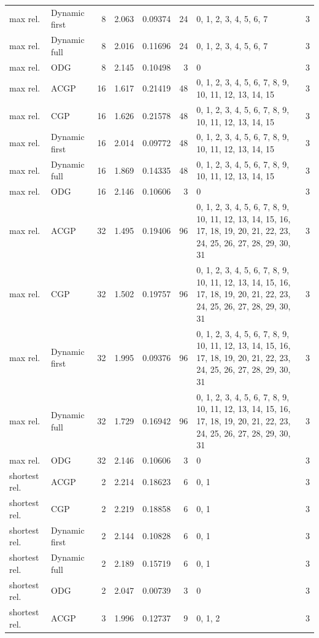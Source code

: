 \documentclass[10pt,a4paper]{article}
\begin{document}
\begin{longtable}{@{}p{23mm}p{29mm}rrrrp{36mm}r@{}}
max rel. & Dynamic first & 8 & 2.063 & 0.09374 & 24 & 0, 1, 2, 3, 4, 5, 6, 7 & 3 \\
max rel. & Dynamic full & 8 & 2.016 & 0.11696 & 24 & 0, 1, 2, 3, 4, 5, 6, 7 & 3 \\
max rel. & ODG & 8 & 2.145 & 0.10498 & 3 & 0 & 3 \\
max rel. & ACGP & 16 & 1.617 & 0.21419 & 48 & 0, 1, 2, 3, 4, 5, 6, 7, 8, 9, 10, 11, 12, 13, 14, 15 & 3 \\
max rel. & CGP & 16 & 1.626 & 0.21578 & 48 & 0, 1, 2, 3, 4, 5, 6, 7, 8, 9, 10, 11, 12, 13, 14, 15 & 3 \\
max rel. & Dynamic first & 16 & 2.014 & 0.09772 & 48 & 0, 1, 2, 3, 4, 5, 6, 7, 8, 9, 10, 11, 12, 13, 14, 15 & 3 \\
max rel. & Dynamic full & 16 & 1.869 & 0.14335 & 48 & 0, 1, 2, 3, 4, 5, 6, 7, 8, 9, 10, 11, 12, 13, 14, 15 & 3 \\
max rel. & ODG & 16 & 2.146 & 0.10606 & 3 & 0 & 3 \\
max rel. & ACGP & 32 & 1.495 & 0.19406 & 96 & 0, 1, 2, 3, 4, 5, 6, 7, 8, 9, 10, 11, 12, 13, 14, 15, 16, 17, 18, 19, 20, 21, 22, 23, 24, 25, 26, 27, 28, 29, 30, 31 & 3 \\
max rel. & CGP & 32 & 1.502 & 0.19757 & 96 & 0, 1, 2, 3, 4, 5, 6, 7, 8, 9, 10, 11, 12, 13, 14, 15, 16, 17, 18, 19, 20, 21, 22, 23, 24, 25, 26, 27, 28, 29, 30, 31 & 3 \\
max rel. & Dynamic first & 32 & 1.995 & 0.09376 & 96 & 0, 1, 2, 3, 4, 5, 6, 7, 8, 9, 10, 11, 12, 13, 14, 15, 16, 17, 18, 19, 20, 21, 22, 23, 24, 25, 26, 27, 28, 29, 30, 31 & 3 \\
max rel. & Dynamic full & 32 & 1.729 & 0.16942 & 96 & 0, 1, 2, 3, 4, 5, 6, 7, 8, 9, 10, 11, 12, 13, 14, 15, 16, 17, 18, 19, 20, 21, 22, 23, 24, 25, 26, 27, 28, 29, 30, 31 & 3 \\
max rel. & ODG & 32 & 2.146 & 0.10606 & 3 & 0 & 3 \\
shortest rel. & ACGP & 2 & 2.214 & 0.18623 & 6 & 0, 1 & 3 \\
shortest rel. & CGP & 2 & 2.219 & 0.18858 & 6 & 0, 1 & 3 \\
shortest rel. & Dynamic first & 2 & 2.144 & 0.10828 & 6 & 0, 1 & 3 \\
shortest rel. & Dynamic full & 2 & 2.189 & 0.15719 & 6 & 0, 1 & 3 \\
shortest rel. & ODG & 2 & 2.047 & 0.00739 & 3 & 0 & 3 \\
shortest rel. & ACGP & 3 & 1.996 & 0.12737 & 9 & 0, 1, 2 & 3 \\

\end{longtable}
\end{document}
